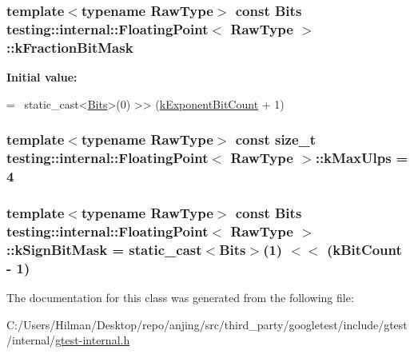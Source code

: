 \subsubsection[{k\+Fraction\+Bit\+Mask}]{\setlength{\rightskip}{0pt plus 5cm}template$<$typename Raw\+Type$>$ const {\bf Bits} {\bf testing\+::internal\+::\+Floating\+Point}$<$ Raw\+Type $>$\+::k\+Fraction\+Bit\+Mask\hspace{0.3cm}{\ttfamily [static]}}\label{classtesting_1_1internal_1_1_floating_point_a0ac75d4ffd24f14bca452abe8a718da1}
{\bfseries Initial value\+:}
\begin{DoxyCode}
=
    ~static\_cast<\hyperlink{classtesting_1_1internal_1_1_floating_point_abf228bf6cd48f12c8b44c85b4971a731}{Bits}>(0) >> (\hyperlink{classtesting_1_1internal_1_1_floating_point_a1973d843c00781053d3073daa8a40119}{kExponentBitCount} + 1)
\end{DoxyCode}
\hypertarget{classtesting_1_1internal_1_1_floating_point_aac498b3714d93f8e88cdc30e4c5935f6}{}
\subsubsection[{k\+Max\+Ulps}]{\setlength{\rightskip}{0pt plus 5cm}template$<$typename Raw\+Type$>$ const size\+\_\+t {\bf testing\+::internal\+::\+Floating\+Point}$<$ Raw\+Type $>$\+::k\+Max\+Ulps = 4\hspace{0.3cm}{\ttfamily [static]}}\label{classtesting_1_1internal_1_1_floating_point_aac498b3714d93f8e88cdc30e4c5935f6}
\hypertarget{classtesting_1_1internal_1_1_floating_point_aca98b5ea6f2222a66a82e52421682efa}{}
\subsubsection[{k\+Sign\+Bit\+Mask}]{\setlength{\rightskip}{0pt plus 5cm}template$<$typename Raw\+Type$>$ const {\bf Bits} {\bf testing\+::internal\+::\+Floating\+Point}$<$ Raw\+Type $>$\+::k\+Sign\+Bit\+Mask = static\+\_\+cast$<${\bf Bits}$>$(1) $<$$<$ ({\bf k\+Bit\+Count} -\/ 1)\hspace{0.3cm}{\ttfamily [static]}}\label{classtesting_1_1internal_1_1_floating_point_aca98b5ea6f2222a66a82e52421682efa}


The documentation for this class was generated from the following file\+:\begin{DoxyCompactItemize}
\item 
C\+:/\+Users/\+Hilman/\+Desktop/repo/anjing/src/third\+\_\+party/googletest/include/gtest/internal/\hyperlink{gtest-internal_8h}{gtest-\/internal.\+h}\end{DoxyCompactItemize}
